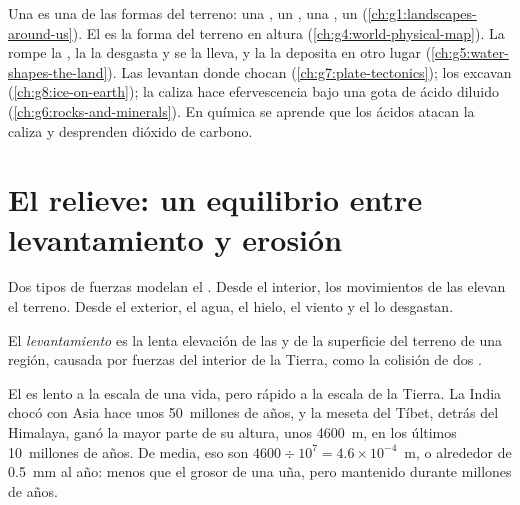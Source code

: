 \begin{recall}
Una \emph{} es una de las formas del terreno: una ,
un , una , un  (\cref{ch:g1:landscapes-around-us}).
El  es la forma del terreno en altura
(\cref{ch:g4:world-physical-map}). La  rompe la , la
 la desgasta y se la lleva, y la  la deposita en otro
lugar (\cref{ch:g5:water-shapes-the-land}). Las  levantan 
donde chocan (\cref{ch:g7:plate-tectonics}); los  excavan  (\cref{ch:g8:ice-on-earth}); la caliza hace efervescencia bajo una
gota de ácido diluido (\cref{ch:g6:rocks-and-minerals}). En química se
aprende que los ácidos atacan la caliza y desprenden dióxido de carbono.
\end{recall}

\section{El relieve: un equilibrio entre levantamiento y erosión}

Dos tipos de fuerzas modelan el . Desde el interior, los
movimientos de las  elevan el terreno. Desde el exterior, el agua,
el hielo, el viento y el  lo desgastan.

\begin{definition}[Levantamiento]\label{def:g9:landforms:uplift}
El \emph{levantamiento} es la lenta elevación de las
 y de la superficie del terreno de una región, causada por fuerzas
del interior de la Tierra, como la colisión de dos .
\end{definition}

El  es lento a la escala de una vida, pero rápido a la escala
de la Tierra. La India chocó con Asia hace unos 50~millones de años, y la
meseta del Tíbet, detrás del Himalaya, ganó la mayor parte de su altura,
unos \qty{4600}{m}, en los últimos 10~millones de años. De media, eso son
$4600 \div 10^7 = 4.6 \times 10^{-4}$~m, o alrededor de \qty{0.5}{mm} al
año: menos que el grosor de una uña, pero mantenido durante millones de
años.

